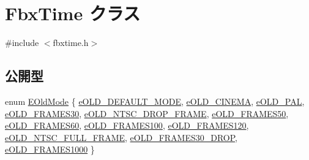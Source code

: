 \hypertarget{class_fbx_time}{}\section{Fbx\+Time クラス}
\label{class_fbx_time}


{\ttfamily \#include $<$fbxtime.\+h$>$}

\subsection*{公開型}
\begin{DoxyCompactItemize}
\item 
enum \hyperlink{class_fbx_time_a860c82fe6f93582e1fe66bb204ece65b}{E\+Old\+Mode} \{ \newline
\hyperlink{class_fbx_time_a860c82fe6f93582e1fe66bb204ece65ba8f63793247842d133037e38f7644cf55}{e\+O\+L\+D\+\_\+\+D\+E\+F\+A\+U\+L\+T\+\_\+\+M\+O\+DE}, 
\hyperlink{class_fbx_time_a860c82fe6f93582e1fe66bb204ece65ba895eba1cad1ff767b5431fea6e559bb7}{e\+O\+L\+D\+\_\+\+C\+I\+N\+E\+MA}, 
\hyperlink{class_fbx_time_a860c82fe6f93582e1fe66bb204ece65ba67148eece1efe5496ab8bbc19cd20ac6}{e\+O\+L\+D\+\_\+\+P\+AL}, 
\hyperlink{class_fbx_time_a860c82fe6f93582e1fe66bb204ece65baff6d6130c8a361248a7a8602f153686b}{e\+O\+L\+D\+\_\+\+F\+R\+A\+M\+E\+S30}, 
\newline
\hyperlink{class_fbx_time_a860c82fe6f93582e1fe66bb204ece65ba124a6ea36cce93212a15601c28e31bc1}{e\+O\+L\+D\+\_\+\+N\+T\+S\+C\+\_\+\+D\+R\+O\+P\+\_\+\+F\+R\+A\+ME}, 
\hyperlink{class_fbx_time_a860c82fe6f93582e1fe66bb204ece65ba4952f5d55a94fdc0765288353566d04c}{e\+O\+L\+D\+\_\+\+F\+R\+A\+M\+E\+S50}, 
\hyperlink{class_fbx_time_a860c82fe6f93582e1fe66bb204ece65ba38cfdeedfabe09e0554f577552c67756}{e\+O\+L\+D\+\_\+\+F\+R\+A\+M\+E\+S60}, 
\hyperlink{class_fbx_time_a860c82fe6f93582e1fe66bb204ece65baaafc966818534a477b407d44ce34deea}{e\+O\+L\+D\+\_\+\+F\+R\+A\+M\+E\+S100}, 
\newline
\hyperlink{class_fbx_time_a860c82fe6f93582e1fe66bb204ece65bab86602de95fae0ec771b8e6c0f5fa4e4}{e\+O\+L\+D\+\_\+\+F\+R\+A\+M\+E\+S120}, 
\hyperlink{class_fbx_time_a860c82fe6f93582e1fe66bb204ece65ba42eadf4f1cc75c07c0d4c05e698c25ea}{e\+O\+L\+D\+\_\+\+N\+T\+S\+C\+\_\+\+F\+U\+L\+L\+\_\+\+F\+R\+A\+ME}, 
\hyperlink{class_fbx_time_a860c82fe6f93582e1fe66bb204ece65bad2edaa91a1bd8c39f6d6e920408fed10}{e\+O\+L\+D\+\_\+\+F\+R\+A\+M\+E\+S30\+\_\+\+D\+R\+OP}, 
\hyperlink{class_fbx_time_a860c82fe6f93582e1fe66bb204ece65bab903421f3f4dfa4d9b022feb54729576}{e\+O\+L\+D\+\_\+\+F\+R\+A\+M\+E\+S1000}
 \}
\end{DoxyCompactItemize}
